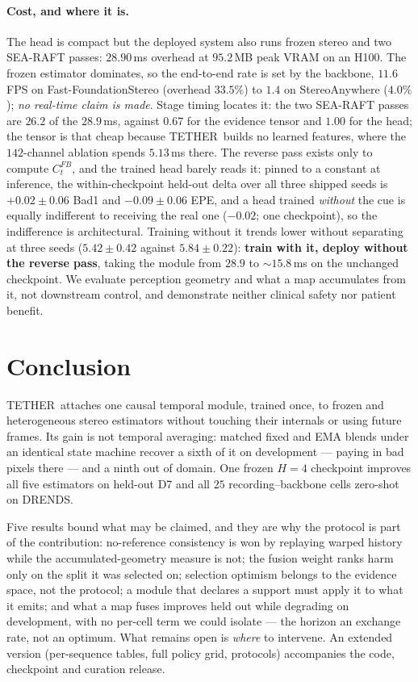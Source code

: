 \documentclass[letterpaper,10pt,conference]{ieeeconf}
\newcommand{\steer}{TETHER}
\begin{document}
\paragraph{Cost, and where it is.}
The head is compact but the deployed system also runs frozen stereo and two
SEA-RAFT passes: $28.90$\,ms overhead at $95.2$\,MB peak VRAM on an H100. The
frozen estimator dominates, so the end-to-end rate is set by the backbone,
$11.6$\,FPS on Fast-FoundationStereo (overhead $33.5\%$) to $1.4$ on
StereoAnywhere ($4.0\%$); \emph{no real-time claim is made}. Stage timing
locates it: the two SEA-RAFT passes are $26.2$ of the $28.9$\,ms, against
$0.67$ for the evidence tensor and $1.00$ for the head; the tensor is that
cheap because \steer\ builds no learned features, where the $142$-channel
ablation spends $5.13$\,ms there. The reverse pass exists only to compute
$C^{FB}_t$, and the trained head barely reads it: pinned to a constant at
inference, the within-checkpoint held-out delta over all three shipped seeds
is $+0.02\pm0.06$ Bad1 and $-0.09\pm0.06$ EPE, and a head trained
\emph{without} the cue is equally indifferent to receiving the real one
($-0.02$; one checkpoint), so the indifference is architectural. Training
without it trends lower without separating at three seeds ($5.42\pm0.42$
against $5.84\pm0.22$): \textbf{train with it, deploy without
the reverse pass}, taking the module from $28.9$ to ${\sim}15.8$\,ms on the
unchanged checkpoint. We evaluate perception geometry and
what a map accumulates from it, not downstream control, and demonstrate
neither clinical safety nor patient benefit.

\section{Conclusion}

\steer\ attaches one causal temporal module, trained once, to frozen and
heterogeneous stereo estimators without touching their internals or using
future frames. Its gain is not temporal averaging: matched fixed and EMA
blends under an identical state machine recover a sixth of it on development
--- paying in bad pixels there --- and a ninth out of domain. One frozen
$H=4$ checkpoint improves all five estimators on held-out D7 and all $25$
recording--backbone cells zero-shot on DRENDS.

Five results bound what may be claimed, and they are why the protocol is
part of the contribution: no-reference consistency is won by replaying warped
history while the accumulated-geometry measure is not; the fusion weight
ranks harm only on the split it was selected on; selection optimism belongs
to the evidence space, not the protocol; a module that declares a support
must apply it to what it emits; and what a map fuses improves held out while
degrading on development, with no per-cell term we could isolate --- the
horizon an exchange rate, not an optimum.
What remains open is \emph{where} to intervene. An extended version (per-sequence tables, full policy grid, protocols) accompanies the code, checkpoint and curation release.
\end{document}
